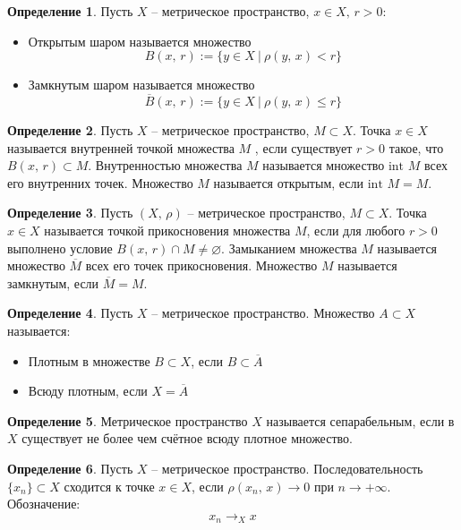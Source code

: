 \documentclass[a4paper,12pt]{article}
\renewcommand{\leq}{\ensuremath{\leqslant}}
\renewcommand{\emptyset}{\ensuremath{\varnothing}}
\theoremstyle{plain}
\theoremstyle{definition}
\newtheorem{definition}{Определение}[section]
\theoremstyle{remark}
\begin{document}
\begin{definition}
	Пусть $X$ -- метрическое пространство, $x \in X,\, r > 0$:
	\begin{itemize}
		\item Открытым шаром называется множество
		      \[
			      B(x,\, r) := \{y \in X \:\vert\: \rho(y,\,x) < r\}
		      \]
		\item Замкнутым шаром называется множество
		      \[
			      \overline{B}(x,\,r) := \{y \in X \:\vert\: \rho(y,\,x) \leq r\}
		      \]
	\end{itemize}
\end{definition}

\begin{definition}
	Пусть $X$ -- метрическое пространство, $M \subset X$. Точка $x \in X$ называется внутренней точкой множества $M$ , если существует $r > 0$ такое, что $B(x,\, r) \subset M$. Внутренностью множества $M$ называется множество $\text{int }M$ всех его внутренних точек. Множество $M$ называется открытым, если $\text{int }M = M$.
\end{definition}

\begin{definition}
	Пусть $(X,\, \rho)$ -- метрическое пространство, $M \subset X$. Точка $x \in X$ называется точкой прикосновения множества $M$, если для любого $r > 0$ выполнено условие $B(x,\, r) \cap M \neq \emptyset$. Замыканием множества $M$ называется множество $\overline{M}$ всех его точек прикосновения. Множество $M$ называется замкнутым, если $\overline{M} = M$.
\end{definition}

\begin{definition}
	Пусть $X$ -- метрическое пространство. Множество $A \subset X$ называется:
	\begin{itemize}
		\item Плотным в множестве $B \subset X$, если $B \subset \overline{A}$
		\item Всюду плотным, если $X = \overline{A}$
	\end{itemize}
\end{definition}

\begin{definition}
	Метрическое пространство $X$ называется сепарабельным, если в $X$ существует не более чем счётное всюду плотное множество.
\end{definition}

\begin{definition}
	Пусть $X$ -- метрическое пространство. Последовательность $\{x_n\} \subset X$ сходится к точке $x \in X$, если $\rho(x_n,\, x) \to 0$ при $n \to +\infty$. Обозначение:
	\[
		x_n \to_X x
	\]
\end{definition}
\end{document}
